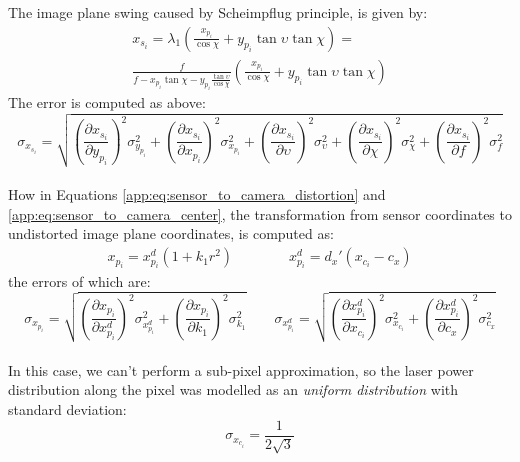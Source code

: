 The image plane swing caused by Scheimpflug principle, is given by:
  \begin{equation}
    \label{app:eq:sch_x}
    \begin{matrix}
      x_{s_i} = 
        \lambda_1\left( \frac{x_{p_i}}{\cos\chi} + y_{p_i}\tan\upsilon\tan\chi \right) = \\
        \frac{f}{f - x_{p_i}\tan\chi - y_{p_i}\frac{\tan\upsilon}{\cos\chi}} \left( \frac{x_{p_i}}{\cos\chi} + y_{p_i}\tan\upsilon\tan\chi \right)
    \end{matrix}
  \end{equation}
The error is computed as above:
  \begin{equation*}
    \sigma_{x_{s_i}} = \sqrt{
      \left( \frac{\partial x_{s_i}}{\partial y_{p_i}} \right)^2 \sigma_{y_{p_i}}^2 +
      \left( \frac{\partial x_{s_i}}{\partial x_{p_i}} \right)^2 \sigma_{x_{p_i}}^2 +
      \left( \frac{\partial x_{s_i}}{\partial \upsilon} \right)^2 \sigma_\upsilon^2 +
      \left( \frac{\partial x_{s_i}}{\partial \chi} \right)^2 \sigma_\chi^2 +
      \left( \frac{\partial x_{s_i}}{\partial f} \right)^2 \sigma_f^2
    }
  \end{equation*} \\

How in Equations \ref{app:eq:sensor_to_camera_distortion} and \ref{app:eq:sensor_to_camera_center}, the transformation from sensor coordinates to undistorted image plane coordinates, is computed as:
\begin{equation}
  \begin{matrix}
    \label{app:eq:camera_to_image_x}
    x_{p_i} = x_{p_i}^d (1 + k_1r^2) \qquad \qquad
    x_{p_i}^d = d_x'(x_{c_i} - c_x)
  \end{matrix}
\end{equation}
the errors of which are:
  \begin{equation*}
    \sigma_{x_{p_i}} = \sqrt{
        \left( \frac{\partial x_{p_i}}{\partial x_{p_i}^d} \right)^2 \sigma_{x_{p_i}^d}^2
        + \left( \frac{\partial x_{p_i}}{\partial k_1} \right)^2 \sigma_{k_1}^2
      }
	  \qquad
    \sigma_{x_{p_i}^d} = \sqrt{
      \left( \frac{\partial x_{p_i}^d}{\partial x_{c_i}} \right)^2 \sigma_{x_{c_i}}^2
      + \left( \frac{\partial x_{p_i}^d}{\partial c_x} \right)^2 \sigma_{c_x}^2
    }
  \end{equation*} \\

In this case, we can't perform a sub-pixel approximation, so the laser power distribution along the pixel was modelled as an \textit{uniform distribution} with standard deviation:
  \begin{equation*}
    \sigma_{x_{c_i}} = \frac{1}{2\sqrt{3}}
  \end{equation*} \\

